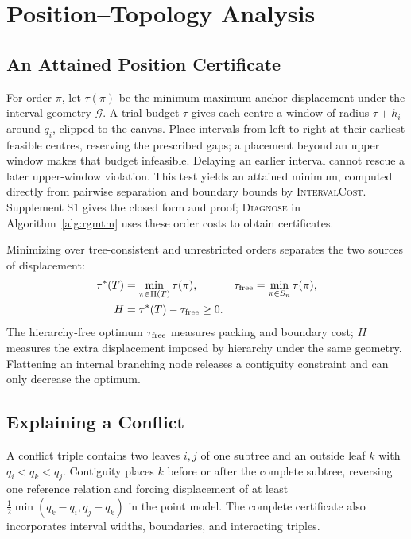 \section{Position--Topology Analysis}\label{sec:analysis}\label{sec:cert}
\subsection{An Attained Position Certificate}
For order $\pi$, let $\tau(\pi)$ be the minimum maximum anchor displacement under the interval geometry $\mathcal G$. A trial budget $\tau$ gives each centre a window of radius $\tau+h_i$ around $q_i$, clipped to the canvas. Place intervals from left to right at their earliest feasible centres, reserving the prescribed gaps; a placement beyond an upper window makes that budget infeasible. Delaying an earlier interval cannot rescue a later upper-window violation. This test yields an attained minimum, computed directly from pairwise separation and boundary bounds by \textsc{IntervalCost}. Supplement S1 gives the closed form and proof; \textsc{Diagnose} in Algorithm~\ref{alg:rgmtm} uses these order costs to obtain certificates.

Minimizing over tree-consistent and unrestricted orders separates the two sources of displacement:
\begin{equation}
\begin{aligned}
\tau^*(T)&=\min_{\pi\in\Pi(T)}\tau(\pi),&
\tau_{\mathrm{free}}&=\min_{\pi\in S_n}\tau(\pi),\\
H&=\tau^*(T)-\tau_{\mathrm{free}}\ge0 .
\end{aligned}\label{eq:certificate}
\end{equation}
The hierarchy-free optimum $\tau_{\mathrm{free}}$ measures packing and boundary cost; $H$ measures the extra displacement imposed by hierarchy under the same geometry. Flattening an internal branching node releases a contiguity constraint and can only decrease the optimum.

\subsection{Explaining a Conflict}
A conflict triple contains two leaves $i,j$ of one subtree and an outside leaf $k$ with $q_i<q_k<q_j$. Contiguity places $k$ before or after the complete subtree, reversing one reference relation and forcing displacement of at least $\tfrac12\min(q_k-q_i,q_j-q_k)$ in the point model. The complete certificate also incorporates interval widths, boundaries, and interacting triples.

